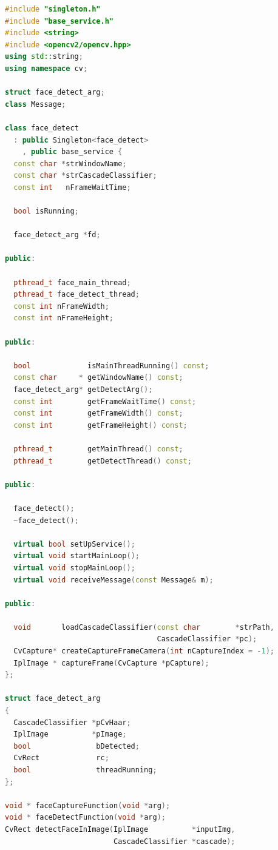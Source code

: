 \documentclass[11pt,a4paper,titlepage]{report}
\begin{document}
\begin{lstlisting}[caption=face-detect.h,language=C++]
#include "singleton.h"
#include "base_service.h"
#include <string>
#include <opencv2/opencv.hpp>
using std::string;
using namespace cv;

struct face_detect_arg;
class Message;

class face_detect
  : public Singleton<face_detect>
    , public base_service {
  const char *strWindowName;
  const char *strCascadeClassifier;
  const int   nFrameWaitTime;

  bool isRunning;

  face_detect_arg *fd;

public:

  pthread_t face_main_thread;
  pthread_t face_detect_thread;
  const int nFrameWidth;
  const int nFrameHeight;

public:

  bool             isMainThreadRunning() const;
  const char     * getWindowName() const;
  face_detect_arg* getDetectArg();
  const int        getFrameWaitTime() const;
  const int        getFrameWidth() const;
  const int        getFrameHeight() const;

  pthread_t        getMainThread() const;
  pthread_t        getDetectThread() const;

public:

  face_detect();
  ~face_detect();

  virtual bool setUpService();
  virtual void startMainLoop();
  virtual void stopMainLoop();
  virtual void receiveMessage(const Message& m);

public:

  void       loadCascadeClassifier(const char        *strPath,
                                   CascadeClassifier *pc);
  CvCapture* createCaptureFrameCamera(int nCaptureIndex = -1);
  IplImage * captureFrame(CvCapture *pCapture);
};

struct face_detect_arg
{
  CascadeClassifier *pCvHaar;
  IplImage          *pImage;
  bool               bDetected;
  CvRect             rc;
  bool               threadRunning;
};

void * faceCaptureFunction(void *arg);
void * faceDetectFunction(void *arg);
CvRect detectFaceInImage(IplImage          *inputImg,
                         CascadeClassifier *cascade);

\end{lstlisting}
\end{document}
